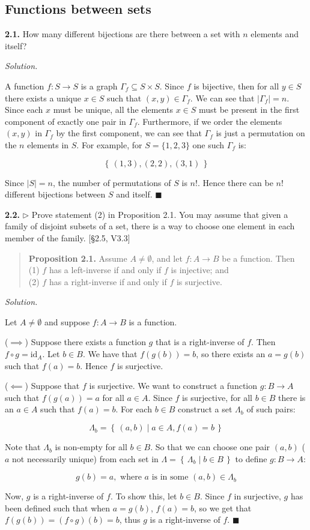 \documentclass[14pt,parskip=full]{scrartcl}
\newcommand{\exercise}[3]{
\noindent
\textbf{#1.} #2

\noindent
\textit{Solution.}{\let\tpar\par \let\par\relax #3}
}
\newcommand{\set}[1]{\left\{\,#1\,\right\}}
\newcommand*{\QEDA}{\hfill\ensuremath{\blacksquare}}
\newcommand{\id}{\mathrm{id}}
\newcommand\abs[1]{\left|#1\right|}
\begin{document}
\subsection{Functions between sets}

\exercise
{2.1}{How many different bijections are there between a set with $n$ elements
and itself?}{

A function $f:S\to S$ is a graph $\Gamma_f\subseteq S\times S$. Since $f$ is
bijective, then for all $y\in S$ there exists a unique $x\in S$ such that
$(x,y)\in\Gamma_f$. We can see that $\abs{\Gamma_f} = n$. Since each $x$ must be
unique, all the elements $x\in S$ must be present in the first component of
exactly one pair in $\Gamma_f$. Furthermore, if we order the elements $(x,y)$ in
$\Gamma_f$ by the first component, we can see that $\Gamma_f$ is just a
permutation on the $n$ elements in $S$. For example, for $S=\{1,2,3\}$ one such
$\Gamma_f$ is:

\[ \set{ (1,3), (2,2), (3,1) } \]

Since $\abs{S} = n$, the number of permutations of $S$ is $n!$. Hence there can be
$n!$ different bijections between $S$ and itself.
\QEDA

}

\exercise
{2.2}{$\rhd$ Prove statement (2) in Proposition 2.1. You may assume that given a
family of disjoint subsets of a set, there is a way to choose one element in
each member of the family. [\S2.5, V3.3]

\begin{quote} \textbf{Proposition 2.1.} Assume $A\neq\emptyset$, and let $f:A\to B$ be a function. Then
(1) $f$ has a left-inverse if and only if $f$ is injective; and \\
(2) $f$ has a right-inverse if and only if $f$ is surjective.
\end{quote}}{

Let $A\neq\emptyset$ and suppose $f:A\to B$ is a function.

\tpar
($\implies$) Suppose there exists a function $g$ that is a right-inverse of $f$.
Then $f\circ g = \id_A$. Let $b\in B$. We have that $f(g(b)) = b$, so there
exists an $a = g(b)$ such that $f(a) = b$. Hence $f$ is surjective.

\tpar
($\impliedby$) Suppose that $f$ is surjective. We want to construct a function
$g:B\to A$ such that $f(g(a)) = a$ for all $a\in A$. Since $f$ is surjective,
for all $b\in B$ there is an $a\in A$ such that $f(a) = b$. For each $b\in B$
construct a set $\Lambda_b$ of such pairs:

\[ \Lambda_b = \set{ (a,b) \mid a \in A, f(a) = b } \]

Note that $\Lambda_b$ is non-empty for all $b\in B$. So that we can choose one
pair $(a,b)$ ($a$ not necessarily unique) from each set in $\Lambda =
\set{\Lambda_b\mid b\in B}$ to define $g:B\to A$:

\[ g(b) = a, \text{ where $a$ is in some $(a,b)\in\Lambda_b$} \]

Now, $g$ is a right-inverse of $f$. To show this, let $b\in B$. Since $f$ in
surjective, $g$ has been defined such that when $a=g(b)$, $f(a)=b$, so we get
that $f(g(b)) = (f\circ g)(b) = b$, thus $g$ is a right-inverse of $f$.
\QEDA

}
\end{document}
